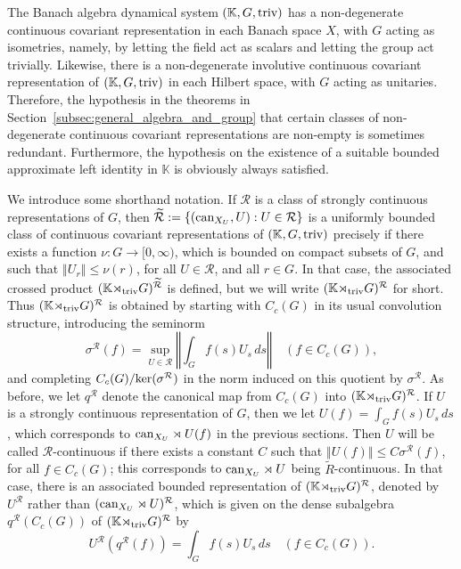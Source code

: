\documentclass{amsart}
\theoremstyle{plain}
\theoremstyle{definition}
\numberwithin{equation}{section}
\begin{document}
The Banach algebra dynamical system $(\mathbb K,G,{\textup{triv}})$ has a non-degenerate continuous covariant representation in each Banach space $X$, with $G$ acting as isometries, namely, by letting the field act as scalars and letting the group act trivially. Likewise, there is a non-degenerate involutive continuous covariant representation of $(\mathbb K,G,{\textup{triv}})$ in each Hilbert space, with $G$ acting as unitaries. Therefore, the hypothesis in the theorems in Section~\ref{subsec:general_algebra_and_group} that certain classes of non-degenerate continuous covariant representations are non-empty is sometimes redundant. Furthermore, the hypothesis on the existence of a suitable bounded approximate left identity in $\mathbb K$ is obviously always satisfied.

We introduce some shorthand notation. If ${\mathcal R}$ is a class of strongly continuous representations of $G$, then $\widetilde{\mathcal R}:=\{(\textup{can}_{X_U},U) : U\in{\mathcal R}\}$ is a uniformly bounded class of continuous covariant representations of $(\mathbb K,G,{\textup{triv}})$ precisely if there exists a function $\nu:G\to [0,\infty)$, which is bounded on compact subsets of $G$, and such that ${\left\Vert {U_r} \right\Vert}\leq \nu(r)$, for all $U\in{\mathcal R}$, and all $r\in G$. In that case, the associated crossed product $(\mathbb K{\rtimes}_{\textup{triv}} G)^{\widetilde{\mathcal R}}$ is defined, but we will write $(\mathbb K{\rtimes}_{\textup{triv}} G)^{\mathcal R}$ for short. Thus $(\mathbb K{\rtimes}_{\textup{triv}} G)^{\mathcal R}$ is obtained by starting with $C_c(G)$ in its usual convolution structure, introducing the seminorm
\[
{\sigma^{\mathcal R}}(f)=\sup_{U\in{\mathcal R}}{\left\Vert {\int_G f(s)U_s{\,ds}} \right\Vert}\quad(f\in C_c(G)),
\]
and completing $C_c(G)/\textup{ker}({\sigma^{\mathcal R}})$ in the norm induced on this quotient by ${\sigma^{\mathcal R}}$. As before, we let ${q^{\mathcal R}}$ denote the canonical map from $C_c(G)$ into $(\mathbb K{\rtimes}_{\textup{triv}} G)^{\mathcal R}$. If $U$ is a strongly continuous representation of $G$, then we let $U(f)=\int_G f(s)U_s{\,ds}$, which corresponds to $\textup{can}_{X_U}\rtimes U(f)$ in the previous sections. Then $U$ will be called ${\mathcal R}$-continuous if there exists a constant $C$ such that ${\left\Vert {U(f)} \right\Vert}\leq C{\sigma^{\mathcal R}}(f)$, for all $f\in C_c(G)$; this corresponds to $\textup{can}_{X_U}\rtimes U$ being $\widetilde R$-continuous. In that case, there is an associated bounded representation of $(\mathbb K{\rtimes}_{\textup{triv}} G)^{\mathcal R}$, denoted by $U^{\mathcal R}$ rather than $(\textup{can}_{X_U}\rtimes U)^{\mathcal R}$, which is given on the dense subalgebra ${q^{\mathcal R}}(C_c(G))$ of $(\mathbb K{\rtimes}_{\textup{triv}} G)^{\mathcal R}$ by
\[
U^{\mathcal R}({q^{\mathcal R}}(f)) = \int_G f(s) U_s {\,ds}\quad (f \in C_c(G)).
\]
\end{document}
